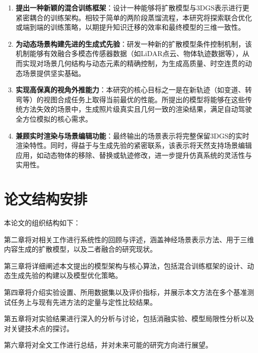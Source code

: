 \begin{enumerate}
\item \textbf{提出一种新颖的混合训练框架}：设计一种能够将扩散模型与3DGS表示进行更紧密耦合的训练架构。相较于简单的两阶段蒸馏流程，本研究将探索联合优化或端到端的训练策略，以期提升知识迁移的效率和最终模型的三维一致性。

\item \textbf{为动态场景构建先进的生成式先验}：研发一种新的扩散模型条件控制机制，该机制能够有效融合多模态传感器数据（如LiDAR点云、物体轨迹数据等），从而实现对场景几何结构与动态元素的精确控制，为生成高质量、时空连贯的动态场景提供坚实基础\cite{yan2024street}。

\item \textbf{实现高保真的视角外推能力}：本研究的核心目标之一是在新轨迹（如变道、转弯等）的视图合成任务上取得当前最优的性能。所提出的模型将能够在这些传统方法失效的场景中，生成照片级真实且几何一致的渲染结果，满足自动驾驶全方位模拟的核心需求\cite{shi2025drivex}。

\item \textbf{兼顾实时渲染与场景编辑功能}：最终输出的场景表示将完整保留3DGS的实时渲染特性。同时，得益于与生成先验的紧密联系，该表示将天然支持场景编辑应用，如动态物体的移除、替换或轨迹修改，进一步提升仿真系统的灵活性与实用性\cite{yan2024street}。
\end{enumerate}

\section{论文结构安排}

本论文的组织结构如下：

第二章将对相关工作进行系统性的回顾与评述，涵盖神经场景表示方法、用于三维内容生成的扩散模型，以及二者融合的研究现状。

第三章将详细阐述本文提出的模型架构与核心算法，包括混合训练框架的设计、动态生成先验的构建以及模型优化策略。

第四章将介绍实验设置、所用数据集以及评价指标，并展示本文方法在多个基准测试任务上与现有先进方法的定量与定性比较结果。

第五章将对实验结果进行深入的分析与讨论，包括消融实验、模型局限性分析以及对关键技术点的探讨。

第六章将对全文工作进行总结，并对未来可能的研究方向进行展望。
